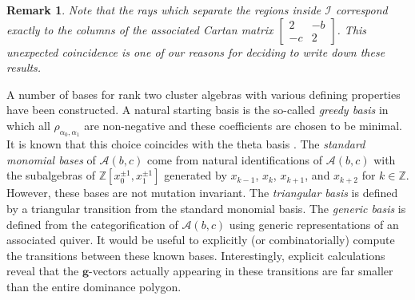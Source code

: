 \documentclass{amsart}
\newtheorem{remark}[theorem]{Remark}
\numberwithin{theorem}{section}
\newcommand{\bfg}{\boldsymbol{g}}
\newcommand{\cA}{\mathcal{A}}
\newcommand{\cI}{\mathcal{I}}
\newcommand{\ZZ}{\mathbb{Z}}
\begin{document}
  \begin{remark}
    Note that the rays which separate the regions inside $\cI$ correspond exactly to the columns of the associated Cartan matrix $\left[ \begin{array}{cc} 2 & -b \\ -c & 2 \end{array} \right]$.
    This unexpected coincidence is one of our reasons for deciding to write down these results.
  \end{remark}

  A number of bases for rank two cluster algebras with various defining properties have been constructed.
  A natural starting basis is the so-called \emph{greedy basis} in which all $\rho_{\alpha_0,\alpha_1}$ are non-negative and these coefficients are chosen to be minimal.
  It is known that this choice coincides with the theta basis \cite{GHKK, CGMMRSW}.
  The \emph{standard monomial bases} of $\cA(b,c)$ come from natural identifications of $\cA(b,c)$ with the subalgebras of $\ZZ[x_0^{\pm1},x_1^{\pm1}]$ generated by $x_{k-1}$, $x_k$, $x_{k+1}$, and $x_{k+2}$ for $k\in\ZZ$.
  However, these bases are not mutation invariant.
  The \emph{triangular basis} is defined by a triangular transition from the standard monomial basis.
  The \emph{generic basis} is defined from the categorification of $\cA(b,c)$ using generic representations of an associated quiver.
  It would be useful to explicitly (or combinatorially) compute the transitions between these known bases.
  Interestingly, explicit calculations reveal that the $\bfg$-vectors actually appearing in these transitions are far smaller than the entire dominance polygon.
\end{document}
